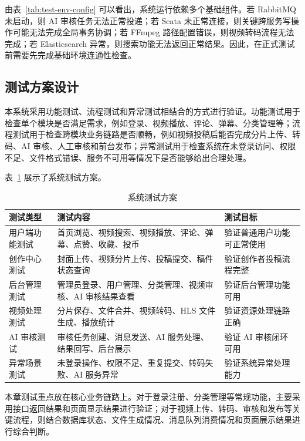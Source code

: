 由表~\ref{tab:test-env-config} 可以看出，系统运行依赖多个基础组件。若 RabbitMQ 未启动，则 AI 审核任务无法正常投递；若 Seata 未正常连接，则关键跨服务写操作可能无法完成全局事务协调；若 FFmpeg 路径配置错误，则视频转码流程无法完成；若 Elasticsearch 异常，则搜索功能无法返回正常结果。因此，在正式测试前需要先完成基础环境连通性检查。

\subsection{测试方案设计}
\label{subsec:test-plan-design}

本系统采用功能测试、流程测试和异常测试相结合的方式进行验证。功能测试用于检查单个模块是否满足需求，例如登录、视频播放、评论、弹幕、分类管理等；流程测试用于检查跨模块业务链路是否顺畅，例如视频投稿后能否完成分片上传、转码、AI 审核、人工审核和前台发布；异常测试用于检查系统在未登录访问、权限不足、文件格式错误、服务不可用等情况下是否能够给出合理处理。

表~\ref{tab:test-plan} 展示了系统测试方案。

\begin{table}[htbp]
  \centering
  \caption{系统测试方案}
  \label{tab:test-plan}
  \begin{tabular}{p{}p{}p{}}
    \hline
    \textbf{测试类型} & \textbf{测试内容} & \textbf{测试目标} \\
    \hline
    用户端功能测试 & 首页浏览、视频搜索、视频播放、评论、弹幕、点赞、收藏、投币 & 验证普通用户功能可正常使用 \\
    创作中心测试 & 封面上传、视频分片上传、投稿提交、稿件状态查询 & 验证创作者投稿流程完整 \\
    后台管理测试 & 管理员登录、用户管理、分类管理、视频审核、AI 审核结果查看 & 验证后台管理功能可用 \\
    视频处理测试 & 分片保存、文件合并、视频转码、HLS 文件生成、播放统计 & 验证资源处理链路正确 \\
    AI 审核测试 & 审核任务创建、消息发送、AI 服务处理、结果回写、后台展示 & 验证 AI 审核闭环可用 \\
    异常场景测试 & 未登录操作、权限不足、重复提交、转码失败、AI 服务异常 & 验证系统异常处理能力 \\
    \hline
  \end{tabular}
\end{table}

本章测试重点放在核心业务链路上。对于登录注册、分类管理等常规功能，主要采用接口返回结果和页面显示结果进行验证；对于视频上传、转码、审核和发布等关键流程，则结合数据库状态、文件生成情况、消息队列消费情况和页面展示结果进行综合判断。

